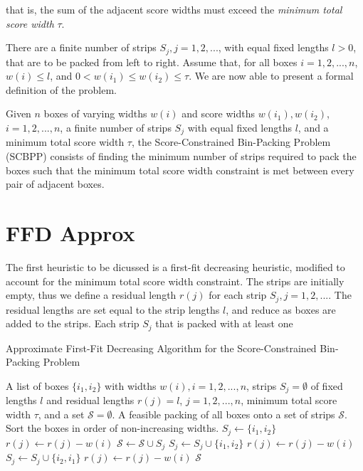 \documentclass[oribibl]{llncs}
\begin{document}
that is, the sum of the adjacent score widths must exceed the \textit{minimum total score width} $\tau$.

There are a finite number of strips $S_j, j = 1, 2, ...$, with equal fixed lengths $l > 0$, that are to be packed from left to right. Assume that, for all boxes $i = 1, 2, ..., n$, $w(i) \leq l$, and $0 < w(i_1) \leq w(i_2) \leq \tau$. We are now able to present a formal definition of the problem.

\begin{definition}
	Given $n$ boxes of varying widths $w(i)$ and score widths $w(i_1), w(i_2)$, $i = 1, 2, ..., n$, a finite number of strips $S_j$ with equal fixed lengths $l$, and a minimum total score width $\tau$, the Score-Constrained Bin-Packing Problem (SCBPP) consists of finding the minimum number of strips required to pack the boxes such that the minimum total score width constraint is met between every pair of adjacent boxes. 
\end{definition}


\section{FFD Approx}
\label{sec:ffdapprox}

The first heuristic to be dicussed is a first-fit decreasing heuristic, modified to account for the minimum total score width constraint. The strips are initially empty, thus we define a residual length $r(j)$ for each strip $S_j, j = 1, 2, ...$. The residual lengths are set equal to the strip lengths $l$, and reduce as boxes are added to the strips. Each strip $S_j$ that is packed with at least one 








\begin{algorithm}[H]
	\caption{\textcolor{OliveGreen}{Approximate First-Fit Decreasing Algorithm for the Score-Constrained Bin-Packing Problem}}
	\label{alg:ffdapprox}
	\begin{algorithmic}[1]
	\Require A list of boxes $\{i_1, i_2\}$ with widths $w(i), i = 1, 2, ..., n$, strips $S_j = \emptyset$ of fixed lengths $l$ and residual lengths $r(j) = l$, $j = 1, 2, ...,n$, minimum total score width $\tau$, and a set $\mathcal{S} = \emptyset$.
	\Ensure A feasible packing of all boxes onto a set of strips $\mathcal{S}$.
	\State Sort the boxes in order of non-increasing widths.
				\State $S_j \gets \{i_1, i_2\}$
				\State $r(j) \gets r(j) - w(i)$
				\State $\mathcal{S} \gets \mathcal{S} \cup S_j$
				\Break
					\State $S_j \gets S_j \cup \{i_1, i_2\}$
					\State $r(j) \gets r(j) - w(i)$
					\Break
					\State $S_j \gets S_j \cup \{i_2, i_1\}$
					\State $r(j) \gets r(j) - w(i)$
					\Break
				\EndIf
			\EndIf
		\EndFor
	\EndFor
	\Return $\mathcal{S}$
	\end{algorithmic}	
\end{algorithm}
\end{document}
